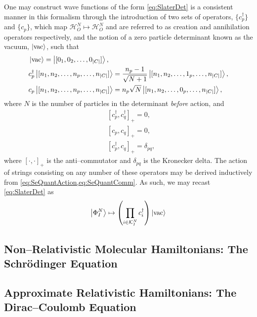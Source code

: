 One may construct wave functions of the form \cref{eq:SlaterDet} is a consistent manner in this formalism through
the introduction of two sets of operators, $\{ c_p^\dagger \}$ and $\{ c_p \}$, which map $\mathcal{H}^N_O \mapsto \mathcal{H}^N_O$ 
and are referred to as creation and annihilation operators respectively, and the notion of a zero particle determinant known as 
the vacuum, $\left\vert \mathrm{vac} \right\rangle$, such that
\begin{subequations}
  \label{eq:SeQuantAction}
\begin{align}
  &\left\vert \mathrm{vac} \right\rangle = \left\vert [0_1, 0_2, \ldots, 0_{\vert C \vert}] \right\rangle, \\
  &c_p^\dagger \left\vert [n_1, n_2, \ldots, n_p, \ldots, n_{\vert C \vert}] \right\rangle = \frac{n_p-1}{\sqrt{N+1}} \left\vert [n_1, n_2, \ldots, 1_p, \ldots, n_{\vert C \vert}] \right\rangle,\\
  &c_p \left\vert [n_1, n_2, \ldots, n_p, \ldots, n_{\vert C \vert}] \right\rangle = {n_p}{\sqrt{N}} \left\vert [n_1, n_2, \ldots, 0_p, \ldots, n_{\vert C \vert}] \right\rangle,
\end{align}
\end{subequations}
where $N$ is the number of particles in the determinant \emph{before} action, and
\begin{subequations}
  \label{eq:SeQuantComm}
\begin{align}
  &[c_p^\dagger, c_q^\dagger]_+ = 0,\\
  &[c_p, c_q]_+ = 0,\\
  &[c_p^\dagger, c_q]_+ = \delta_{pq},
\end{align}
\end{subequations}
where $[\cdot,\cdot]_+$ is the anti--commutator and $\delta_{pq}$ is the Kronecker delta. The action of strings consisting on any number of these 
operators may be derived inductively from \cref{eq:SeQuantAction,eq:SeQuantComm}. As such, we may recast \cref{eq:SlaterDet} as
\begin{equation}
  \left\vert \Phi^N_I \right\rangle \mapsto \left(\prod_{i \in \mathcal{K}^N_I} c_i^\dagger\right) \left\vert \mathrm{vac} \right\rangle
\end{equation}

\subsection{Non--Relativistic Molecular Hamiltonians: The Schr\"{o}dinger Equation}
\label{sec:NRH}

\subsection{Approximate Relativistic Hamiltonians: The Dirac--Coulomb Equation}
\label{sec:RELH}



